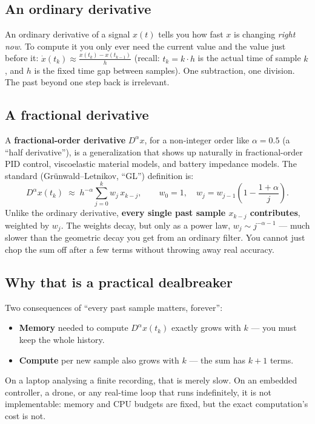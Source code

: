 \documentclass[11pt]{article}
\begin{document}
\subsection{An ordinary derivative}
An ordinary derivative of a signal $x(t)$ tells you how fast $x$ is changing \emph{right now}. To compute it you only ever need the current value and the value just before it: $\dot x(t_k) \approx \frac{x(t_k)-x(t_{k-1})}{h}$ (recall: $t_k=k\cdot h$ is the actual time of sample $k$, and $h$ is the fixed time gap between samples). One subtraction, one division. The past beyond one step back is irrelevant.

\subsection{A fractional derivative}
A \textbf{fractional-order derivative} $D^\alpha x$, for a non-integer order like $\alpha=0.5$ (a ``half derivative''), is a generalization that shows up naturally in fractional-order PID control, viscoelastic material models, and battery impedance models. The standard (Gr\"unwald--Letnikov, ``GL'') definition is:
\[
D^\alpha x(t_k) \;\approx\; h^{-\alpha} \sum_{j=0}^{k} w_j\, x_{k-j},
\qquad w_0 = 1,\quad w_j = w_{j-1}\!\left(1 - \frac{1+\alpha}{j}\right).
\]
Unlike the ordinary derivative, \textbf{every single past sample $x_{k-j}$ contributes}, weighted by $w_j$. The weights decay, but only as a power law, $w_j \sim j^{-\alpha-1}$ --- much slower than the geometric decay you get from an ordinary filter. You cannot just chop the sum off after a few terms without throwing away real accuracy.

\subsection{Why that is a practical dealbreaker}
Two consequences of ``every past sample matters, forever'':
\begin{itemize}
\item \textbf{Memory} needed to compute $D^\alpha x(t_k)$ exactly grows with $k$ --- you must keep the whole history.
\item \textbf{Compute} per new sample also grows with $k$ --- the sum has $k{+}1$ terms.
\end{itemize}
On a laptop analysing a finite recording, that is merely slow. On an embedded controller, a drone, or any real-time loop that runs indefinitely, it is not implementable: memory and CPU budgets are fixed, but the exact computation's cost is not.
\end{document}
